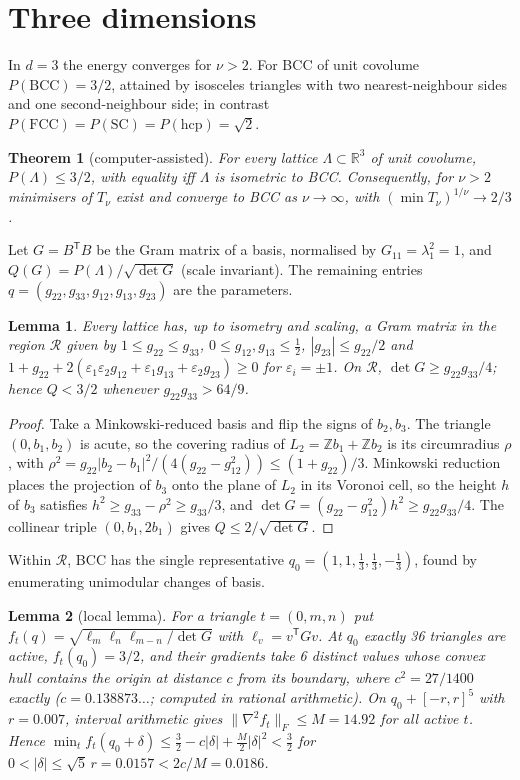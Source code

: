 \documentclass[10pt,twocolumn,a4paper]{article}
\newtheorem{theorem}{Theorem}
\newtheorem{lemma}{Lemma}
\theoremstyle{definition}
\newcommand{\R}{\mathbb{R}}
\newcommand{\Z}{\mathbb{Z}}
\begin{document}
\section{Three dimensions}\label{sec:3d}
In $d=3$ the energy converges for $\nu>2$. For BCC of unit covolume $P(\mathrm{BCC})=3/2$, attained by isosceles triangles with two nearest-neighbour sides and one second-neighbour side; in contrast $P(\mathrm{FCC})=P(\mathrm{SC})=P(\mathrm{hcp})=\sqrt2$.

\begin{theorem}[computer-assisted]\label{thm:3d}
For every lattice $\Lambda\subset\R^3$ of unit covolume, $P(\Lambda)\le3/2$, with equality iff $\Lambda$ is isometric to BCC. Consequently, for $\nu>2$ minimisers of $T_\nu$ exist and converge to BCC as $\nu\to\infty$, with $(\min T_\nu)^{1/\nu}\to2/3$.
\end{theorem}
Let $G=B^{\mathsf T}B$ be the Gram matrix of a basis, normalised by $G_{11}=\lambda_1^2=1$, and $Q(G)=P(\Lambda)/\sqrt{\det G}$ (scale invariant). The remaining entries $q=(g_{22},g_{33},g_{12},g_{13},g_{23})$ are the parameters.

\begin{lemma}\label{lem:region}
Every lattice has, up to isometry and scaling, a Gram matrix in the region $\mathcal R$ given by $1\le g_{22}\le g_{33}$, $0\le g_{12},g_{13}\le\frac12$, $|g_{23}|\le g_{22}/2$ and $1+g_{22}+2(\varepsilon_1\varepsilon_2g_{12}+\varepsilon_1g_{13}+\varepsilon_2g_{23})\ge0$ for $\varepsilon_i=\pm1$. On $\mathcal R$, $\det G\ge g_{22}g_{33}/4$; hence $Q<3/2$ whenever $g_{22}g_{33}>64/9$.
\end{lemma}
\begin{proof}
Take a Minkowski-reduced basis and flip the signs of $b_2,b_3$. The triangle $(0,b_1,b_2)$ is acute, so the covering radius of $L_2=\Z b_1+\Z b_2$ is its circumradius $\rho$, with $\rho^2=g_{22}|b_2-b_1|^2/(4(g_{22}-g_{12}^2))\le(1+g_{22})/3$. Minkowski reduction places the projection of $b_3$ onto the plane of $L_2$ in its Voronoi cell, so the height $h$ of $b_3$ satisfies $h^2\ge g_{33}-\rho^2\ge g_{33}/3$, and $\det G=(g_{22}-g_{12}^2)h^2\ge g_{22}g_{33}/4$. The collinear triple $(0,b_1,2b_1)$ gives $Q\le2/\sqrt{\det G}$.
\end{proof}
Within $\mathcal R$, BCC has the single representative $q_0=(1,1,\frac13,\frac13,-\frac13)$, found by enumerating unimodular changes of basis.

\begin{lemma}[local lemma]\label{lem:local3}
For a triangle $t=(0,m,n)$ put $f_t(q)=\sqrt{\ell_m\ell_n\ell_{m-n}/\det G}$ with $\ell_v=v^{\mathsf T}Gv$. At $q_0$ exactly 36 triangles are active, $f_t(q_0)=3/2$, and their gradients take 6 distinct values whose convex hull contains the origin at distance $c$ from its boundary, where $c^2=27/1400$ exactly ($c=0.138873\ldots$; computed in rational arithmetic). On $q_0+[-r,r]^5$ with $r=0.007$, interval arithmetic gives $\|\nabla^2f_t\|_F\le M=14.92$ for all active $t$. Hence $\min_tf_t(q_0+\delta)\le\frac32-c|\delta|+\frac M2|\delta|^2<\frac32$ for $0<|\delta|\le\sqrt5\,r=0.0157<2c/M=0.0186$.
\end{lemma}
\end{document}
